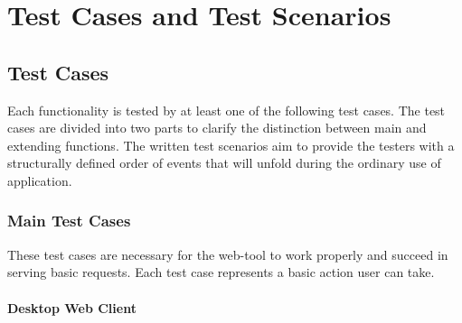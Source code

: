 \section{Test Cases and Test Scenarios}
\subsection{Test Cases}
Each functionality is tested by at least one of the following test cases. The test cases are divided into two parts to clarify the distinction between main and extending functions. The written test scenarios aim to provide the testers with a structurally defined order of events that will unfold during the ordinary use of application.
\subsubsection{Main Test Cases}
These test cases are necessary for the web-tool to work properly and succeed in serving
basic requests. Each test case represents a basic action user can take.

\paragraph{Desktop Web Client}


